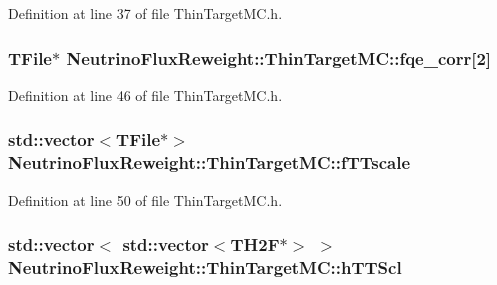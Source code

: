 Definition at line 37 of file Thin\-Target\-M\-C.\-h.

\hypertarget{class_neutrino_flux_reweight_1_1_thin_target_m_c_ab0e2409c1f0e956fc5f37a77d8b82bb7}{
\subsubsection[{fqe\-\_\-corr}]{\setlength{\rightskip}{0pt plus 5cm}T\-File$\ast$ Neutrino\-Flux\-Reweight\-::\-Thin\-Target\-M\-C\-::fqe\-\_\-corr\mbox{[}2\mbox{]}\hspace{0.3cm}{\ttfamily [private]}}}\label{class_neutrino_flux_reweight_1_1_thin_target_m_c_ab0e2409c1f0e956fc5f37a77d8b82bb7}


Definition at line 46 of file Thin\-Target\-M\-C.\-h.

\hypertarget{class_neutrino_flux_reweight_1_1_thin_target_m_c_a2ef318836e2368d80484d0dc8c95fdf9}{
\subsubsection[{f\-T\-Tscale}]{\setlength{\rightskip}{0pt plus 5cm}std\-::vector$<$T\-File$\ast$$>$ Neutrino\-Flux\-Reweight\-::\-Thin\-Target\-M\-C\-::f\-T\-Tscale\hspace{0.3cm}{\ttfamily [private]}}}\label{class_neutrino_flux_reweight_1_1_thin_target_m_c_a2ef318836e2368d80484d0dc8c95fdf9}


Definition at line 50 of file Thin\-Target\-M\-C.\-h.

\hypertarget{class_neutrino_flux_reweight_1_1_thin_target_m_c_ad9a8f8e4902dc073e8a6fb6bbd1be893}{
\subsubsection[{h\-T\-T\-Scl}]{\setlength{\rightskip}{0pt plus 5cm}std\-::vector$<$ std\-::vector$<$T\-H2\-F$\ast$$>$ $>$ Neutrino\-Flux\-Reweight\-::\-Thin\-Target\-M\-C\-::h\-T\-T\-Scl}}\label{class_neutrino_flux_reweight_1_1_thin_target_m_c_ad9a8f8e4902dc073e8a6fb6bbd1be893}


